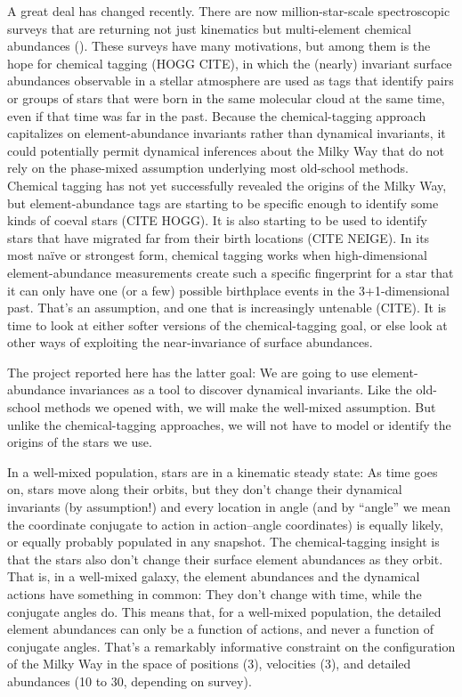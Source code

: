 \documentclass[modern]{aastex62}
\begin{document}
A great deal has changed recently.
There are now million-star-scale spectroscopic surveys that are returning not
just kinematics but multi-element chemical abundances (\citealt{apogee, galah, sdssv}).
These surveys have many motivations, but among them is the hope for
chemical tagging (HOGG CITE), in which the (nearly) invariant surface
abundances observable in a stellar atmosphere are used as tags that identify
pairs or groups of stars that were born in the same molecular cloud at the same time,
even if that time was far in the past.
Because the chemical-tagging approach capitalizes on element-abundance invariants
rather than dynamical invariants, it could potentially permit dynamical inferences
about the Milky Way that do not rely on the phase-mixed assumption underlying
most old-school methods.
Chemical tagging has not yet successfully revealed the origins of
the Milky Way, but element-abundance tags are starting to be specific enough to
identify some kinds of coeval stars (CITE HOGG).
It is also starting to be used to identify stars that have
migrated far from their birth locations (CITE NEIGE).
In its most na\"ive or strongest form, chemical tagging works when high-dimensional
element-abundance measurements create such a specific fingerprint for a star that it
can only have one (or a few) possible birthplace events in the 3+1-dimensional past.
That's an assumption, and one that is increasingly untenable (CITE).
It is time to look at either softer versions of the chemical-tagging goal, or else
look at other ways of exploiting the near-invariance of surface abundances.

The project reported here has the latter goal:
We are going to use element-abundance invariances as a tool to discover dynamical
invariants.
Like the old-school methods we opened with, we will make the well-mixed assumption.
But unlike the chemical-tagging approaches, we will not have to model or identify
the origins of the stars we use.

In a well-mixed population, stars are in a kinematic steady state:
As time goes on, stars move along their orbits, but they don't change their dynamical
invariants (by assumption!) and every location in angle (and by ``angle'' we mean the
coordinate conjugate to action in action--angle coordinates) is equally likely, or
equally probably populated in any snapshot.
The chemical-tagging insight is that the stars also don't change their surface element
abundances as they orbit.
That is, in a well-mixed galaxy, the element abundances and the dynamical actions have
something in common:
They don't change with time, while the conjugate angles do.
This means that, for a well-mixed population, the detailed element abundances can only
be a function of actions, and never a function of conjugate angles.
That's a remarkably informative constraint on the configuration of the Milky Way in
the space of positions (3), velocities (3), and detailed abundances (10 to 30, depending
on survey).
\end{document}
